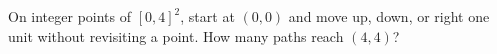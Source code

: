 On integer points of $[0,4]^2$, start at $(0,0)$ and move up, down, or right one unit without revisiting a point. How many paths reach $(4,4)$?

